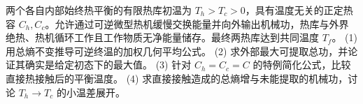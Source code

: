 两个各自内部始终热平衡的有限热库初温为 \(T_h>T_c>0\)，具有温度无关的正定热容 \(C_h,C_c\)。允许通过可逆微型热机缓慢交换能量并向外输出机械功，热库与外界绝热、热机循环工作且工作物质无净能量储存。最终两热库达到共同温度 \(T_f\)。
(1) 用总熵不变推导可逆终温的加权几何平均公式。
(2) 求外部最大可提取总功，并论证其确实是给定初态下的最大值。
(3) 针对 \(C_h=C_c=C\) 的特例简化公式，比较直接热接触后的平衡温度。
(4) 求直接接触造成的总熵增与未能提取的机械功，讨论 \(T_h\to T_c\) 的小温差展开。
